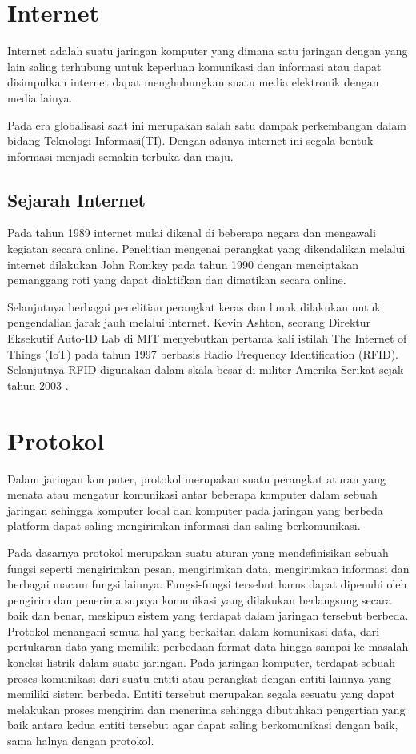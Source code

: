 \section{Internet}
Internet adalah suatu jaringan komputer yang dimana satu jaringan dengan yang lain saling terhubung untuk keperluan komunikasi dan informasi atau dapat disimpulkan internet dapat menghubungkan suatu media elektronik dengan media lainya.

Pada era globalisasi saat ini merupakan salah satu dampak perkembangan dalam bidang Teknologi Informasi(TI). Dengan adanya internet ini segala bentuk informasi menjadi semakin terbuka dan maju.

\subsection{Sejarah Internet}
Pada tahun 1989 internet mulai dikenal di beberapa negara dan mengawali kegiatan secara online.
Penelitian mengenai perangkat yang dikendalikan melalui internet dilakukan John Romkey pada tahun 1990
dengan menciptakan  pemanggang roti yang dapat diaktifkan dan dimatikan secara online.

Selanjutnya berbagai penelitian  perangkat  keras  dan  lunak dilakukan untuk pengendalian jarak jauh melalui internet.
Kevin Ashton, seorang Direktur Eksekutif Auto-ID Lab di MIT menyebutkan pertama kali istilah The Internet of Things (IoT)
pada tahun 1997 berbasis Radio Frequency  Identification (RFID). Selanjutnya  RFID digunakan dalam skala besar di militer
Amerika Serikat sejak tahun 2003 \cite{wilianto2018sejarah}.

\section{Protokol}
Dalam jaringan komputer, protokol merupakan suatu perangkat aturan yang menata atau mengatur komunikasi antar beberapa komputer dalam sebuah jaringan sehingga komputer local dan komputer pada jaringan yang berbeda platform dapat saling mengirimkan informasi dan saling berkomunikasi.

Pada dasarnya protokol merupakan suatu aturan yang mendefinisikan sebuah fungsi seperti mengirimkan pesan, mengirimkan data, mengirimkan informasi dan berbagai macam fungsi lainnya. Fungsi-fungsi tersebut harus dapat dipenuhi oleh pengirim dan penerima supaya komunikasi yang dilakukan berlangsung secara baik dan benar, meskipun sistem yang terdapat dalam jaringan tersebut berbeda. Protokol menangani semua hal yang berkaitan dalam komunikasi data, dari pertukaran data yang memiliki perbedaan format data hingga sampai ke masalah koneksi listrik dalam suatu jaringan. Pada jaringan komputer, terdapat sebuah proses komunikasi dari suatu entiti atau perangkat dengan entiti lainnya yang memiliki sistem berbeda. Entiti tersebut merupakan segala sesuatu yang dapat melakukan proses mengirim dan menerima sehingga dibutuhkan pengertian yang baik antara kedua entiti tersebut agar dapat saling berkomunikasi dengan baik, sama halnya dengan protokol.

